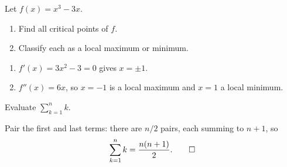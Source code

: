 \begin{problem}
  Let $f(x) = x^3 - 3x$.
  \begin{enumerate}
    \item Find all critical points of $f$.
    \item Classify each as a local maximum or minimum.
  \end{enumerate}
\end{problem}
\begin{solution}
  \begin{enumerate}
    \item $f'(x) = 3x^2 - 3 = 0$ gives $x = \pm 1$.
    \item $f''(x) = 6x$, so $x = -1$ is a local maximum and $x = 1$ a local minimum.
  \end{enumerate}
\end{solution}

\begin{problem}
  Evaluate $\displaystyle\sum_{k=1}^{n} k$.
\end{problem}
\begin{solution}
  Pair the first and last terms: there are $n/2$ pairs, each summing to $n+1$, so
  \[
    \sum_{k=1}^{n} k = \frac{n(n+1)}{2}. \qedhere
  \]
\end{solution}


